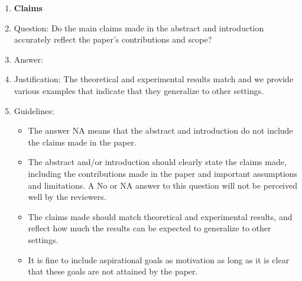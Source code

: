 \documentclass{article} %
\newcounter{ct}
\theoremstyle{definition}
\theoremstyle{remark}
\begin{document}


\begin{enumerate}

\item {\bf Claims}
    \item[] Question: Do the main claims made in the abstract and introduction accurately reflect the paper's contributions and scope?
    \item[] Answer: \answerYes{} %
    \item[] Justification: The theoretical and experimental results match and we provide various examples that indicate that they generalize to other settings.
    \item[] Guidelines:
    \begin{itemize}
        \item The answer NA means that the abstract and introduction do not include the claims made in the paper.
        \item The abstract and/or introduction should clearly state the claims made, including the contributions made in the paper and important assumptions and limitations. A No or NA answer to this question will not be perceived well by the reviewers.
        \item The claims made should match theoretical and experimental results, and reflect how much the results can be expected to generalize to other settings.
        \item It is fine to include aspirational goals as motivation as long as it is clear that these goals are not attained by the paper.
    \end{itemize}


\end{enumerate}
\end{document}
